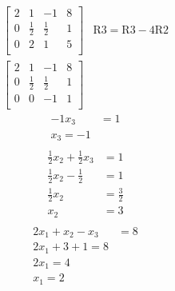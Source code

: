 \documentclass[12pt,twoside]{amsart}
\begin{document}
\begin{enumerate}
\begin{align*}
        \left[\begin{array}{ccc|c}
            2 & 1 & -1 & 8 \\
            0 & \frac{1}{2} & \frac{1}{2} & 1 \\
            0 & 2 & 1 & 5 \\
        \end{array}\right] & \text{R3} = \text{R3} - 4\text{R2} \\
        \left[\begin{array}{ccc|c}
            2 & 1 & -1 & 8 \\
            0 & \frac{1}{2} & \frac{1}{2} & 1 \\
            0 & 0 & -1 & 1 \\
        \end{array}\right]
    \end{align*}
    \begin{align*}
        -1x_3 & = 1 \\
        x_3 = -1 \\
    \end{align*}
    \begin{align*}
        \frac{1}{2}x_2 + \frac{1}{2}x_3 & = 1 \\
        \frac{1}{2}x_2 - \frac{1}{2} & = 1 \\
        \frac{1}{2}x_2 & = \frac{3}{2} \\
        x_2 & = 3 \\
    \end{align*}
    \begin{align*}
        2x_1 + x_2 - x_3 & = 8 \\
        2x_1 + 3 + 1 = 8 \\
        2x_1 = 4 \\
        x_1 = 2 \\
    \end{align*}
    \bigskip


\end{enumerate}
\end{document}
